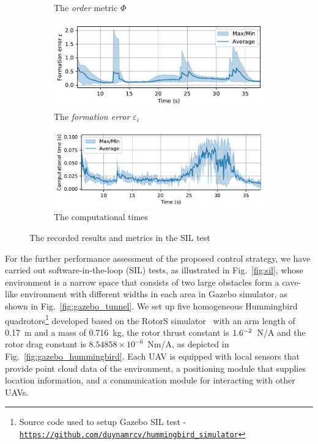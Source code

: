 \begin{figure}
\begin{subfigure}[b]{0.48\textwidth}
    \caption{The \textit{order} metric $\Phi$}
    \label{fig:gazebo_order}
    \end{subfigure}
    \begin{subfigure}[b]{0.48\textwidth}
    \includegraphics[width=\textwidth]{paper3/images/gazebo_error.pdf}
    \caption{The \textit{formation error} $\varepsilon_i$}
    \label{fig:gazebo_error}
    \end{subfigure}
    \begin{subfigure}[b]{0.48\textwidth}
    \includegraphics[width=\textwidth]{paper3/images/gazebo_computation.pdf}
    \caption{The computational times}
    \label{fig:gazebo_time}
    \end{subfigure}
    \caption{The recorded results and metrics in the SIL test}
    \label{fig:gazebo}
\end{figure}

For the further performance assessment of the proposed control strategy, we have carried out software-in-the-loop (SIL) tests, as illustrated in Fig.~\ref{fig:sil}, whose environment is a narrow space that consists of two large obstacles form a cave-like environment with different widths in each area in Gazebo simulator, as shown in Fig.~\ref{fig:gazebo_tunnel}. We set up five homogeneous Hummingbird quadrotors\footnote{Source code used to setup Gazebo SIL test - {\tt\url{https://github.com/duynamrcv/hummingbird_simulator}}} developed based on the RotorS simulator~\cite{Furrer2016} with an arm length of 0.17~m and a mass of 0.716~kg, the rotor thrust constant is $1.6\time10^{-2}$~N/A and the rotor drag constant is $8.54858\times10^{-6}$~Nm/A, as depicted in Fig.~\ref{fig:gazebo_hummingbird}. Each UAV is equipped with local sensors that provide point cloud data of the environment, a positioning module that supplies location information, and a communication module for interacting with other UAVs.

